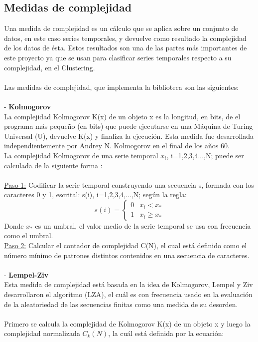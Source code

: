 \documentclass[14pt]{extarticle}
\theoremstyle{definition}
\theoremstyle{remark}
\begin{document}
\subsection{Medidas de complejidad}\label{sec:medidasdecomplejidad}
Una medida de complejidad es un cálculo que se aplica sobre un conjunto de datos, en este caso series temporales,  y devuelve como resultado la complejidad de los datos de ésta. Estos resultados son una de las partes más importantes de este proyecto ya que se usan para clasificar series temporales respecto a su complejidad, en el Clustering.\\\\
Las medidas de complejidad, que implementa la biblioteca son las siguientes:\\\\
- \textbf{Kolmogorov}\cite{article:kolmogorov}\cite{wiki:kolmogorov}\\
La complejidad Kolmogorov K(x) de un objeto x es la longitud, en bits, de el programa más pequeño (en bits) que puede ejecutarse en una Máquina de Turing Universal \cite{wiki:maquinaturing} (U), devuelve K(x) y finaliza la ejecución. Esta medida fue desarrollada independientemente por Andrey N. Kolmogorov en el final de los años 60.\\
La complejidad Kolmogorov de una serie temporal \(x_{i}\), i=1,2,3,4...,N; puede ser calculada de la siguiente forma \cite{article:kolmogorovcomplexity}: \\\\
\underline{Paso 1:} Codificar la serie temporal construyendo una secuencia s, formada con los caracteres 0 y 1, escrital: s(i), i=1,2,3,4,...,N; según la regla:
$$s(i)= \left\{ 
\begin{array}{lcc}
0 & x_{i} < x_{*} \\
1 & x_{i} \geq x_{*} 
\end{array}
\right.
$$
Donde \(x_{*}\) es un umbral, el valor medio de la serie temporal se usa con frecuencia como el umbral.\\
\underline{Paso 2:} Calcular el contador de complejidad C(N), el cual está definido como el número mínimo de patrones distintos contenidos en una secuencia de caracteres.\\\\
- \textbf{Lempel-Ziv}\cite{article:lempelziv}\\
Esta medida de complejidad está basada en la idea de Kolmogorov, Lempel y Ziv desarrollaron el algoritmo (LZA), el cuál es con frecuencia usado en la evaluación de la aleatoriedad de las secuencias finitas como una medida de su desorden.\\\\Primero se calcula la complejidad de Kolmogorov K(x) de un objeto x y luego la complejidad normalizada \(C_{k}(N)\), la cuál está definida por la ecuación:
\end{document}
